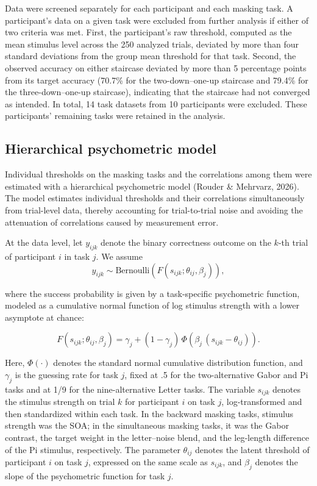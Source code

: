 \documentclass[
  ,man]{apa6}
\begin{document}
Data were screened separately for each participant and each masking task. A participant's data on a given task were excluded from further analysis if either of two criteria was met. First, the participant's raw threshold, computed as the mean stimulus level across the 250 analyzed trials, deviated by more than four standard deviations from the group mean threshold for that task. Second, the observed accuracy on either staircase deviated by more than 5 percentage points from its target accuracy (70.7\% for the two-down--one-up staircase and 79.4\% for the three-down--one-up staircase), indicating that the staircase had not converged as intended. In total, 14 task datasets from 10 participants were excluded. These participants' remaining tasks were retained in the analysis.

\subsection{Hierarchical psychometric model}\label{hierarchical-psychometric-model}

Individual thresholds on the masking tasks and the correlations among them were estimated with a hierarchical psychometric model (Rouder \& Mehrvarz, 2026). The model estimates individual thresholds and their correlations simultaneously from trial-level data, thereby accounting for trial-to-trial noise and avoiding the attenuation of correlations caused by measurement error.

At the data level, let \(y_{ijk}\) denote the binary correctness outcome on the \(k\)-th trial of participant \(i\) in task \(j\). We assume
\[
y_{ijk} \sim \text{Bernoulli}\!\left(F(s_{ijk}; \theta_{ij}, \beta_{j})\right),
\]

where the success probability is given by a task-specific psychometric function, modeled as a cumulative normal function of log stimulus strength with a lower asymptote at chance:

\[
F(s_{ijk}; \theta_{ij}, \beta_{j}) = \gamma_j + (1-\gamma_j)\,\Phi\!\left(\beta_j\,(s_{ijk}-\theta_{ij})\right).
\]

Here, \(\Phi(\cdot)\) denotes the standard normal cumulative distribution function, and \(\gamma_j\) is the guessing rate for task \(j\), fixed at .5 for the two-alternative Gabor and Pi tasks and at 1/9 for the nine-alternative Letter tasks. The variable \(s_{ijk}\) denotes the stimulus strength on trial \(k\) for participant \(i\) on task \(j\), log-transformed and then standardized within each task. In the backward masking tasks, stimulus strength was the SOA; in the simultaneous masking tasks, it was the Gabor contrast, the target weight in the letter--noise blend, and the leg-length difference of the Pi stimulus, respectively. The parameter \(\theta_{ij}\) denotes the latent threshold of participant \(i\) on task \(j\), expressed on the same scale as \(s_{ijk}\), and \(\beta_j\) denotes the slope of the psychometric function for task \(j\).
\end{document}
